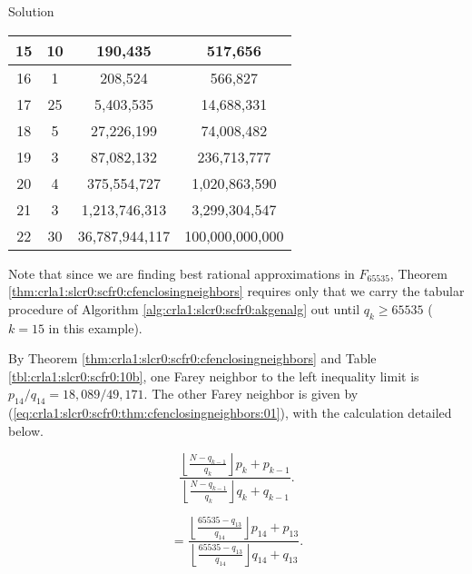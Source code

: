 \begin{vworkexampleparsection}{Solution}
\begin{table}
\begin{center}
\begin{tabular}{|c|c|c|c|}
\hline
\small{15}    & \small{10}    & \small{190,435}         & \small{517,656}         \\
\hline
\small{16}    & \small{1}     & \small{208,524}         & \small{566,827}          \\
\hline
\small{17}    & \small{25}    & \small{5,403,535}       & \small{14,688,331}       \\
\hline
\small{18}    & \small{5}     & \small{27,226,199}      & \small{74,008,482}       \\
\hline
\small{19}    & \small{3}     & \small{87,082,132}      & \small{236,713,777}      \\
\hline
\small{20}    & \small{4}     & \small{375,554,727}     & \small{1,020,863,590}    \\
\hline
\small{21}    & \small{3}     & \small{1,213,746,313}   & \small{3,299,304,547}    \\
\hline
\small{22}    & \small{30}    & \small{36,787,944,117}  & \small{100,000,000,000}  \\
\hline
\end{tabular}
\end{center}
\end{table}

Note that since we are finding best rational approximations
in $F_{65535}$, Theorem \ref{thm:crla1:slcr0:scfr0:cfenclosingneighbors}
requires only that we carry the tabular procedure of 
Algorithm \ref{alg:crla1:slcr0:scfr0:akgenalg} out until
$q_k \geq 65535$ ($k=15$ in this example).

By
Theorem \ref{thm:crla1:slcr0:scfr0:cfenclosingneighbors}
and
Table \ref{tbl:crla1:slcr0:scfr0:10b}, one Farey neighbor
to the left inequality limit is $p_{14}/q_{14} = 18,089/49,171$.
The other Farey neighbor is given by 
(\ref{eq:crla1:slcr0:scfr0:thm:cfenclosingneighbors:01}), with the calculation
detailed below.

\begin{equation}
\label{eq:ex:crla1:slcr0:scfr0:10:50a}
\frac{{\displaystyle{\left\lfloor {\frac{{N - q_{k - 1} }}{{q_k }}} \right\rfloor}
 p_k  + p_{k - 1} }}{{\displaystyle{\left\lfloor {\frac{{N - q_{k - 1} }}{{q_k }}}
 \right\rfloor} q_k  + q_{k - 1} }}.
\end{equation}

\begin{equation}
\label{eq:ex:crla1:slcr0:scfr0:10:50b}
= \frac{{\displaystyle{\left\lfloor {\frac{{65535 - q_{13} }}{{q_{14} }}} \right\rfloor}
 p_{14}  + p_{13} }}{{\displaystyle{\left\lfloor {\frac{{65535 - q_{13} }}{{q_{14} }}}
 \right\rfloor} q_{14}  + q_{13} }}.
\end{equation}


\end{vworkexampleparsection}
